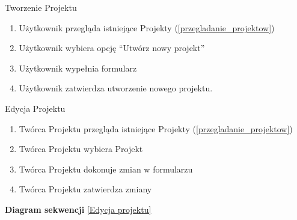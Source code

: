 \begin{usecase}{Tworzenie Projektu}
\label{tworzenie_projektu}
	\begin{enumerate}
    \item Użytkownik przegląda istniejące Projekty (\ref{przegladanie_projektow})
    \item Użytkownik wybiera opcję  “Utwórz nowy projekt”
    \item Użytkownik wypełnia formularz
    \item Użytkownik zatwierdza utworzenie nowego projektu.
	\end{enumerate}
\end{usecase}


\begin{usecase}{Edycja Projektu}
	\begin{enumerate}
    \item Twórca Projektu przegląda istniejące Projekty (\ref{przegladanie_projektow})
    \item Twórca Projektu wybiera Projekt
    \item Twórca Projektu dokonuje zmian w formularzu
    \item Twórca Projektu zatwierdza zmiany
	\end{enumerate}
	\parindent=0cm
	\textbf{Diagram sekwencji}
	\ref{Edycja projektu}
\end{usecase}


